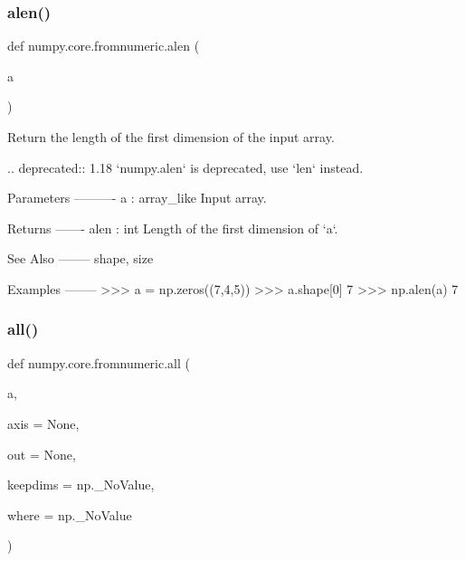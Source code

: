 \subsubsection{\texorpdfstring{alen()}{alen()}}
{\footnotesize\ttfamily def numpy.\+core.\+fromnumeric.\+alen (\begin{DoxyParamCaption}\item[{}]{a }\end{DoxyParamCaption})}

\begin{DoxyVerb}Return the length of the first dimension of the input array.

.. deprecated:: 1.18
   `numpy.alen` is deprecated, use `len` instead.

Parameters
----------
a : array_like
   Input array.

Returns
-------
alen : int
   Length of the first dimension of `a`.

See Also
--------
shape, size

Examples
--------
>>> a = np.zeros((7,4,5))
>>> a.shape[0]
7
>>> np.alen(a)
7\end{DoxyVerb}
 \mbox{\label{namespacenumpy_1_1core_1_1fromnumeric_aec1c1c22945bfd82b42a4a4aaba06d0b}} 
\subsubsection{\texorpdfstring{all()}{all()}}
{\footnotesize\ttfamily def numpy.\+core.\+fromnumeric.\+all (\begin{DoxyParamCaption}\item[{}]{a,  }\item[{}]{axis = {\ttfamily None},  }\item[{}]{out = {\ttfamily None},  }\item[{}]{keepdims = {\ttfamily np.\+\_\+NoValue},  }\item[{}]{where = {\ttfamily np.\+\_\+NoValue} }\end{DoxyParamCaption})}

